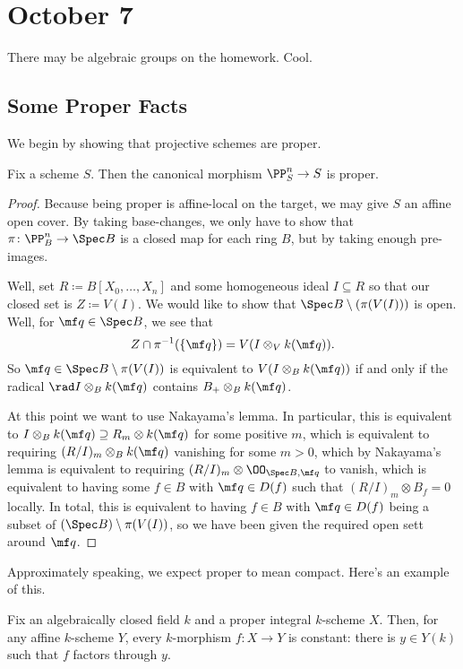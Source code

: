 \documentclass[../notes.tex]{subfiles}
\begin{document}
\section{October 7}

There may be algebraic groups on the homework. Cool.

\subsection{Some Proper Facts}
We begin by showing that projective schemes are proper.
\begin{proposition}
	Fix a scheme $S$. Then the canonical morphism $\PP^n_S\to S$ is proper.
\end{proposition}
\begin{proof}
	Because being proper is affine-local on the target, we may give $S$ an affine open cover. By taking base-changes, we only have to show that $\pi\colon\PP^n_B\to\Spec B$ is a closed map for each ring $B$, but by taking enough pre-images.

	Well, set $R\coloneqq B[X_0,\ldots,X_n]$ and some homogeneous ideal $I\subseteq R$ so that our closed set is $Z\coloneqq V(I)$. We would like to show that $\Spec B\setminus(\pi(V(I)))$ is open. Well, for $\mf q\in\Spec B$, we see that
	\[Z\cap\pi^{-1}(\{\mf q\})=V(I\otimes_Vk(\mf q)).\]
	So $\mf q\in\Spec B\setminus\pi(V(I))$ is equivalent to $V(I\otimes_Bk(\mf q))$ if and only if the radical $\rad I\otimes_Bk(\mf q)$ contains $B_+\otimes_Bk(\mf q)$.
	
	At this point we want to use Nakayama's lemma. In particular, this is equivalent to $I\otimes_Bk(\mf q)\supseteq R_m\otimes k(\mf q)$ for some positive $m$, which is equivalent to requiring $(R/I)_m\otimes_Bk(\mf q)$ vanishing for some $m>0$, which by Nakayama's lemma is equivalent to requiring $(R/I)_m\otimes\OO_{\Spec B,\mf q}$ to vanish, which is equivalent to having some $f\in B$ with $\mf q\in D(f)$ such that $(R/I)_m\otimes B_f=0$ locally. In total, this is equivalent to having $f\in B$ with $\mf q\in D(f)$ being a subset of $(\Spec B)\setminus\pi(V(I))$, so we have been given the required open sett around $\mf q$.
\end{proof}
Approximately speaking, we expect proper to mean compact. Here's an example of this.
\begin{proposition}
	Fix an algebraically closed field $k$ and a proper integral $k$-scheme $X$. Then, for any affine $k$-scheme $Y$, every $k$-morphism $f\colon X\to Y$ is constant: there is $y\in Y(k)$ such that $f$ factors through $y$.
\end{proposition}
\end{document}
